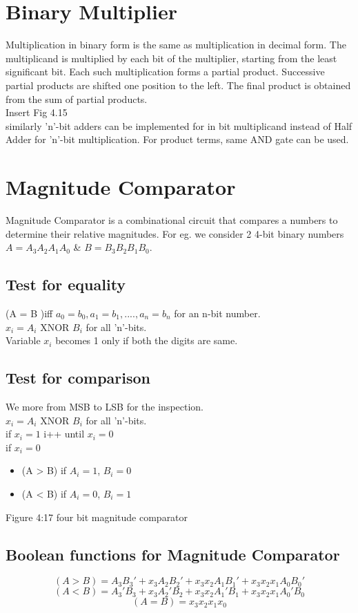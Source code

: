 \section{Binary Multiplier}
Multiplication in binary form is the same as multiplication in decimal form. The multiplicand is multiplied by each bit of the multiplier, starting from the least significant bit. Each such multiplication forms a partial product. Successive partial products are shifted one position to the left. The final product is obtained from the sum of partial products.\\ 
Insert Fig 4.15 \\
similarly 'n'-bit adders can be implemented for in bit multiplicand instead of Half Adder for 'n'-bit multiplication. For product terms, same AND gate can be used. \section{Magnitude Comparator}
Magnitude Comparator is a combinational circuit that compares a numbers to determine their relative magnitudes. For eg. we consider 2 4-bit binary numbers \(A = A_3A_2A_1A_0\) \& \(B = B_3B_2B_1B_0\).

\subsection{Test for equality}
(A = B )\quad \quad iff \(a_0 = b_0, a_1 = b_1, .... , a_n = b_n\) for an n-bit number.\\
\( x_i = A_i\) XNOR \(B_i\) for all 'n'-bits.\\ 
Variable \(x_i\) becomes 1 only if both the digits are same.
\subsection{Test for comparison}
We more from MSB to LSB for the inspection.\\
\( x_i = A_i\) XNOR \(B_i\) for all 'n'-bits.\\
if \( x_i = 1\) i++ until \( x_i = 0\)\\
if \( x_i = 0\)
\begin{itemize}
    \item (A > B) if \( A_i = 1\), \( B_i = 0\) 
    \item (A < B) if \( A_i = 0\), \( B_i = 1\) 
\end{itemize}

Figure 4:17 four bit magnitude comparator 

\subsection{Boolean functions for Magnitude Comparator}
\[ (A > B) = A_3B_3' + x_3A_2B_2' + x_3x_2A_1B_1'+ x_3x_2x_1A_0B_0'\]
\[ (A < B) = A_3'B_3 + x_3A_2'B_2 + x_3x_2A_1'B_1+ x_3x_2x_1A_0'B_0\]
\[ (A = B) = x_3x_2x_1x_0\]

